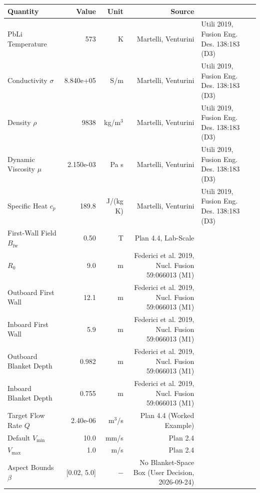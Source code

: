 \begin{tabular}{lrrr}
\toprule
Quantity & Value & Unit & Source \\
\midrule
PbLi Temperature & 573 & K & Martelli, Venturini & Utili 2019, Fusion Eng. Des. 138:183 (D3) \\
Conductivity $\sigma$ & 8.840e+05 & S/m & Martelli, Venturini & Utili 2019, Fusion Eng. Des. 138:183 (D3) \\
Density $\rho$ & 9838 & kg/m$^3$ & Martelli, Venturini & Utili 2019, Fusion Eng. Des. 138:183 (D3) \\
Dynamic Viscosity $\mu$ & 2.150e-03 & Pa s & Martelli, Venturini & Utili 2019, Fusion Eng. Des. 138:183 (D3) \\
Specific Heat $c_p$ & 189.8 & J/(kg K) & Martelli, Venturini & Utili 2019, Fusion Eng. Des. 138:183 (D3) \\
First-Wall Field $B_\mathrm{fw}$ & 0.50 & T & Plan 4.4, Lab-Scale \\
$R_0$ & 9.0 & m & Federici et al. 2019, Nucl. Fusion 59:066013 (M1) \\
Outboard First Wall & 12.1 & m & Federici et al. 2019, Nucl. Fusion 59:066013 (M1) \\
Inboard First Wall & 5.9 & m & Federici et al. 2019, Nucl. Fusion 59:066013 (M1) \\
Outboard Blanket Depth & 0.982 & m & Federici et al. 2019, Nucl. Fusion 59:066013 (M1) \\
Inboard Blanket Depth & 0.755 & m & Federici et al. 2019, Nucl. Fusion 59:066013 (M1) \\
Target Flow Rate $Q$ & 2.40e-06 & m$^3$/s & Plan 4.4 (Worked Example) \\
Default $V_\mathrm{min}$ & 10.0 & mm/s & Plan 2.4 \\
$V_\mathrm{max}$ & 1.0 & m/s & Plan 2.4 \\
Aspect Bounds $\beta$ & [0.02, 5.0] & $-$ & No Blanket-Space Box (User Decision, 2026-09-24) \\
\bottomrule
\end{tabular}
